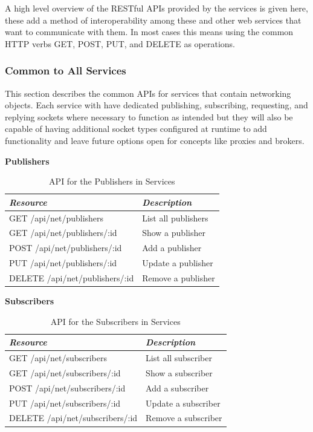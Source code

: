    A high level overview of the RESTful APIs provided by the services is given
    here, these add a method of interoperability among these and other web
    services that want to communicate with them. In most cases this means using
    the common HTTP verbs GET, POST, PUT, and DELETE as operations.

    \subsubsection{Common to All Services}\label{sec:rest-common}

      This section describes the common APIs for services that contain
      networking objects. Each service with have dedicated publishing,
      subscribing, requesting, and replying sockets where necessary to function
      as intended but they will also be capable of having additional socket
      types configured at runtime to add functionality and leave future options
      open for concepts like proxies and brokers.

      \large{\textbf{Publishers}}

      \begin{table}[H]
        \centering
        \begin{tabular}{p{3in} p{3in}}
          \toprule
          \emph{Resource} & \emph{Description} \\ [0.5ex]
          \midrule
          GET /api/net/publishers & List all publishers \\
          GET /api/net/publishers/:id & Show a publisher \\
          POST /api/net/publishers/:id & Add a publisher \\
          PUT /api/net/publishers/:id & Update a publisher \\
          DELETE /api/net/publishers/:id & Remove a publisher \\
          \bottomrule
        \end{tabular}
        \caption{API for the Publishers in Services}\label{tab:rest-common-pub}
      \end{table}

      \large{\textbf{Subscribers}}

      \begin{table}[H]
        \centering
        \begin{tabular}{p{3in} p{3in}}
          \toprule
          \emph{Resource} & \emph{Description} \\ [0.5ex]
          \midrule
          GET /api/net/subscribers & List all subscriber \\
          GET /api/net/subscribers/:id & Show a subscriber \\
          POST /api/net/subscribers/:id & Add a subscriber \\
          PUT /api/net/subscribers/:id & Update a subscriber \\
          DELETE /api/net/subscribers/:id & Remove a subscriber \\
          \bottomrule
        \end{tabular}
        \caption{API for the Subscribers in Services}\label{tab:rest-common-sub}
      \end{table}

